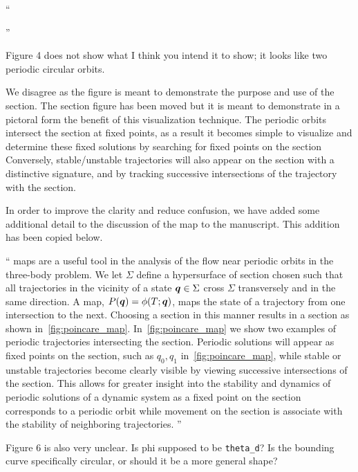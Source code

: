 \documentclass[11pt]{article}
\newenvironment{correction}{\begin{list}{}{\setlength{\leftmargin}{1cm}\setlength{\rightmargin}{1cm}}\vspace{\parsep}\item[]``}{''\end{list}}
\begin{document}
\begin{enumerate}
\begin{correction}
\begin{figure}
\end{figure}
\end{correction}
\item
    \begin{itshape}
Figure 4 does not show what I think you intend it to show; it looks like two periodic circular orbits.
\end{itshape}

We disagree as the figure is meant to demonstrate the purpose and use of the \Poincare section.
The \Poincare section figure has been moved but it is meant to demonstrate in a pictoral form the benefit of this visualization technique.
The periodic orbits intersect the section at fixed points, as a result it becomes simple to visualize and determine these fixed solutions by searching for fixed points on the section
Conversely, stable/unstable trajectories will also appear on the section with a distinctive signature, and by tracking successive intersections of the trajectory with the \Poincare section.

In order to improve the clarity and reduce confusion, we have added some additional detail to the discussion of the \Poincare map to the manuscript.
This addition has been copied below.
\begin{correction}
\Poincare maps are a useful tool in the analysis of the flow near periodic orbits in the three-body problem.
We let \( \Sigma \) define a hypersurface of section chosen such that all trajectories in the vicinity of a state \( \bm{q} \in \Sigma \) cross \( \Sigma \) transversely and in the same direction.
A \Poincare map, \( P(\bm{q}) = \phi(T;\bm{q}) \), maps the state of a trajectory from one intersection to the next.
Choosing a section in this manner results in a \Poincare section as shown in~\cref{fig:poincare_map}.
In~\cref{fig:poincare_map} we show two examples of periodic trajectories intersecting the \Poincare section. 
Periodic solutions will appear as fixed points on the section, such as \( q_0, q_1 \) in~\cref{fig:poincare_map}, while stable or unstable trajectories become clearly visible by viewing successive intersections of the section.
This allows for greater insight into the stability and dynamics of periodic solutions of a dynamic system as a fixed point on the \Poincare section corresponds to a periodic orbit while movement on the section is associate with the stability of neighboring trajectories. 
\end{correction}

\item
    \begin{itshape}
Figure 6 is also very unclear.  Is phi supposed to be \texttt{theta\_d}?  Is the bounding curve specifically circular, or should it be a more general shape?
\end{itshape}


\end{enumerate}
\end{document}
